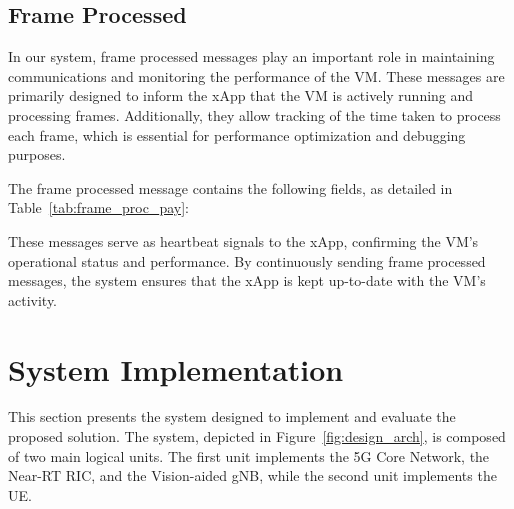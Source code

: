 \subsection{Frame Processed}\label{subsec:frame-processed}
In our system, frame processed messages play an important role in maintaining communications and monitoring the performance of the VM.
These messages are primarily designed to inform the xApp that the VM is actively running and processing frames.
Additionally, they allow tracking of the time taken to process each frame, which is essential for performance optimization and debugging purposes.

The frame processed message contains the following fields, as detailed in Table~\ref{tab:frame_proc_pay}:

\begin{table}[H]
    \caption{Components of the Frame Processed message payload.}
    \label{tab:frame_proc_pay}
    \centering
\end{table}

These messages serve as heartbeat signals to the xApp, confirming the VM's operational status and performance.
By continuously sending frame processed messages, the system ensures that the xApp is kept up-to-date with the VM's activity.


\section{System Implementation}\label{sec:system-implementation}

This section presents the system designed to implement and evaluate the proposed solution.
The system, depicted in Figure~\ref{fig:design_arch}, is composed of two main logical units.
The first unit implements the 5G Core Network, the Near-RT RIC, and the Vision-aided gNB, while the second unit implements the UE\@.

